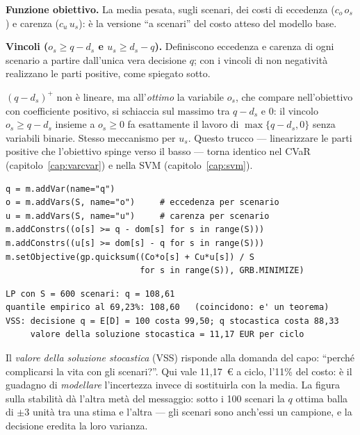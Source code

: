\begin{spiegazione}
\textbf{Funzione obiettivo.} La media pesata, sugli scenari, dei costi di eccedenza
($c_o\, o_s$) e carenza ($c_u\, u_s$): è la versione ``a scenari'' del costo atteso
del modello base.

\textbf{Vincoli ($o_s \ge q - d_s$ e $u_s \ge d_s - q$).} Definiscono eccedenza e
carenza di ogni scenario a partire dall'unica vera decisione $q$; con i vincoli di
non negatività realizzano le parti positive, come spiegato sotto.
\end{spiegazione}

\begin{spiegazione}
$(q - d_s)^+$ non è lineare, ma all'\emph{ottimo} la variabile $o_s$, che compare
nell'obiettivo con coefficiente positivo, si schiaccia sul massimo tra $q - d_s$ e
$0$: il vincolo $o_s \ge q - d_s$ insieme a $o_s \ge 0$ fa esattamente il lavoro di
$\max\{q - d_s, 0\}$ senza variabili binarie. Stesso meccanismo per $u_s$. Questo
trucco --- linearizzare le parti positive che l'obiettivo spinge verso il basso ---
torna identico nel CVaR (capitolo~\ref{cap:varcvar}) e nella SVM
(capitolo~\ref{cap:svm}).
\end{spiegazione}

\begin{lstlisting}[style=python]
q = m.addVar(name="q")
o = m.addVars(S, name="o")     # eccedenza per scenario
u = m.addVars(S, name="u")     # carenza per scenario
m.addConstrs((o[s] >= q - dom[s] for s in range(S)))
m.addConstrs((u[s] >= dom[s] - q for s in range(S)))
m.setObjective(gp.quicksum((Co*o[s] + Cu*u[s]) / S
                           for s in range(S)), GRB.MINIMIZE)
\end{lstlisting}

\begin{lstlisting}[style=output]
LP con S = 600 scenari: q = 108,61
quantile empirico al 69,23%: 108,60   (coincidono: e' un teorema)
VSS: decisione q = E[D] = 100 costa 99,50; q stocastica costa 88,33
     valore della soluzione stocastica = 11,17 EUR per ciclo
\end{lstlisting}

\begin{insight}
Il \emph{valore della soluzione stocastica} (VSS) risponde alla domanda del capo:
``perché complicarsi la vita con gli scenari?''. Qui vale 11,17~\euro{} a ciclo,
l'11\% del costo: è il guadagno di \emph{modellare} l'incertezza invece di sostituirla
con la media. La figura sulla stabilità dà l'altra metà del messaggio: sotto i 100
scenari la $q$ ottima balla di $\pm 3$ unità tra una stima e l'altra --- gli scenari
sono anch'essi un campione, e la decisione eredita la loro varianza.
\end{insight}

